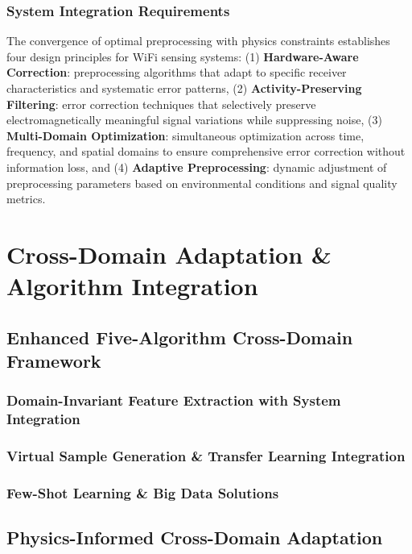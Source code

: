 \documentclass[journal]{IEEEtran}
\begin{document}
\subsubsection{System Integration Requirements}

The convergence of optimal preprocessing with physics constraints establishes four design principles for WiFi sensing systems: (1) \textbf{Hardware-Aware Correction}: preprocessing algorithms that adapt to specific receiver characteristics and systematic error patterns, (2) \textbf{Activity-Preserving Filtering}: error correction techniques that selectively preserve electromagnetically meaningful signal variations while suppressing noise, (3) \textbf{Multi-Domain Optimization}: simultaneous optimization across time, frequency, and spatial domains to ensure comprehensive error correction without information loss, and (4) \textbf{Adaptive Preprocessing}: dynamic adjustment of preprocessing parameters based on environmental conditions and signal quality metrics.

\section{Cross-Domain Adaptation \& Algorithm Integration}
\label{sec:cross_domain}

\subsection{Enhanced Five-Algorithm Cross-Domain Framework}
\subsubsection{Domain-Invariant Feature Extraction with System Integration}
\subsubsection{Virtual Sample Generation \& Transfer Learning Integration}
\subsubsection{Few-Shot Learning \& Big Data Solutions}

\subsection{Physics-Informed Cross-Domain Adaptation}
\end{document}
